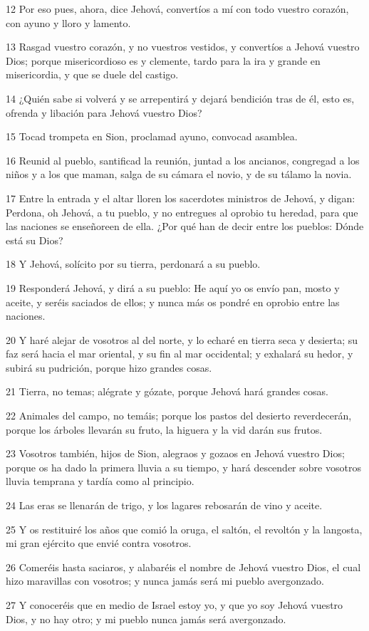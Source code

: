 \par 12 Por eso pues, ahora, dice Jehová, convertíos a mí con todo vuestro corazón, con ayuno y lloro y lamento.
\par 13 Rasgad vuestro corazón, y no vuestros vestidos, y convertíos a Jehová vuestro Dios; porque misericordioso es y clemente, tardo para la ira y grande en misericordia, y que se duele del castigo.
\par 14 ¿Quién sabe si volverá y se arrepentirá y dejará bendición tras de él, esto es, ofrenda y libación para Jehová vuestro Dios?
\par 15 Tocad trompeta en Sion, proclamad ayuno, convocad asamblea.
\par 16 Reunid al pueblo, santificad la reunión, juntad a los ancianos, congregad a los niños y a los que maman, salga de su cámara el novio, y de su tálamo la novia.
\par 17 Entre la entrada y el altar lloren los sacerdotes ministros de Jehová, y digan: Perdona, oh Jehová, a tu pueblo, y no entregues al oprobio tu heredad, para que las naciones se enseñoreen de ella. ¿Por qué han de decir entre los pueblos: Dónde está su Dios?
\par 18 Y Jehová, solícito por su tierra, perdonará a su pueblo.
\par 19 Responderá Jehová, y dirá a su pueblo: He aquí yo os envío pan, mosto y aceite, y seréis saciados de ellos; y nunca más os pondré en oprobio entre las naciones.
\par 20 Y haré alejar de vosotros al del norte, y lo echaré en tierra seca y desierta; su faz será hacia el mar oriental, y su fin al mar occidental; y exhalará su hedor, y subirá su pudrición, porque hizo grandes cosas.
\par 21 Tierra, no temas; alégrate y gózate, porque Jehová hará grandes cosas.
\par 22 Animales del campo, no temáis; porque los pastos del desierto reverdecerán, porque los árboles llevarán su fruto, la higuera y la vid darán sus frutos.
\par 23 Vosotros también, hijos de Sion, alegraos y gozaos en Jehová vuestro Dios; porque os ha dado la primera lluvia a su tiempo, y hará descender sobre vosotros lluvia temprana y tardía como al principio.
\par 24 Las eras se llenarán de trigo, y los lagares rebosarán de vino y aceite.
\par 25 Y os restituiré los años que comió la oruga, el saltón, el revoltón y la langosta, mi gran ejército que envié contra vosotros.
\par 26 Comeréis hasta saciaros, y alabaréis el nombre de Jehová vuestro Dios, el cual hizo maravillas con vosotros; y nunca jamás será mi pueblo avergonzado.
\par 27 Y conoceréis que en medio de Israel estoy yo, y que yo soy Jehová vuestro Dios, y no hay otro; y mi pueblo nunca jamás será avergonzado.

